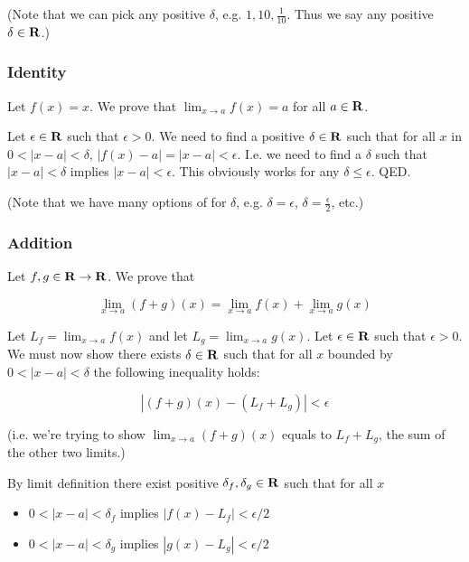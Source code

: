 \vs

(Note that we can pick any positive $\delta$, e.g.
$1, 10, \frac{1}{10}$. Thus we say any positive $\delta\in\mathbf{R}$.)

\subsubsection{Identity}

Let $f(x)=x$. We prove that $\lim_{x\to a}f(x)=a$ for all $a\in\mathbf{R}$.

\vs

Let $\epsilon\in\mathbf{R}$ such that $\epsilon>0$. We need to find a positive
$\delta\in\mathbf{R}$ such that for all $x$ in $0<|x-a|<\delta$,
$|f(x)-a|=|x-a|<\epsilon$. I.e. we need to find a $\delta$ such that
$|x-a|<\delta$ implies $|x-a|<\epsilon$. This obviously works for any $\delta\leq\epsilon$. QED.

\vs

(Note that we have many options of for $\delta$, e.g.
$\delta=\epsilon$, $\delta=\frac{\epsilon}{2}$, etc.)

\subsubsection{Addition}

Let $f,g\in\mathbf{R}\to\mathbf{R}$. We prove that

\[\lim_{x\to a}(f+g)(x)=\lim_{x\to a}f(x)+\lim_{x\to a}g(x)\]

Let $L_f=\lim_{x\to a}f(x)$ and let $L_g=\lim_{x\to a}g(x)$. Let
$\epsilon\in\mathbf{R}$ such that $\epsilon>0$. We must now show there exists
$\delta\in\mathbf{R}$ such that for all $x$ bounded by $0<|x-a|<\delta$ the following
inequality holds:

\begin{equation}
|(f+g)(x)-(L_f+L_g)|<\epsilon    
\end{equation}

(i.e. we're trying to show $\lim_{x\to a}(f+g)(x)$ equals to $L_f+L_g$, the sum of the other two limits.)

\vs

By limit definition there exist positive $\delta_f, \delta_g\in\mathbf{R}$ such that for all $x$

\begin{itemize}
    \item $0<|x-a|<\delta_f$ implies $|f(x)-L_f|<\epsilon/2$
    \item $0<|x-a|<\delta_g$ implies $|g(x)-L_g|<\epsilon/2$
\end{itemize}

